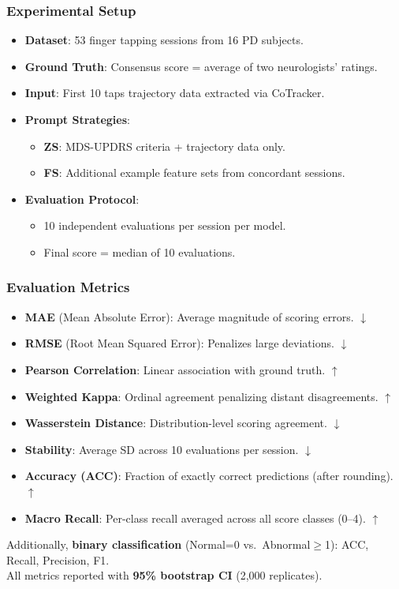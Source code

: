 \documentclass[aspectratio=169]{beamer}
\begin{document}
\begin{frame}
    \frametitle{Experimental Setup}
    \begin{itemize}
        \item \textbf{Dataset}: 53 finger tapping sessions from 16 PD subjects.
        \item \textbf{Ground Truth}: Consensus score = average of two neurologists' ratings.
        \item \textbf{Input}: First 10 taps trajectory data extracted via CoTracker.
        \item \textbf{Prompt Strategies}:
        \begin{itemize}
            \item \textbf{ZS}: MDS-UPDRS criteria + trajectory data only.
            \item \textbf{FS}: Additional example feature sets from concordant sessions.
        \end{itemize}
        \item \textbf{Evaluation Protocol}:
        \begin{itemize}
            \item 10 independent evaluations per session per model.
            \item Final score = median of 10 evaluations.
        \end{itemize}
    \end{itemize}
\end{frame}


\begin{frame}
    \frametitle{Evaluation Metrics}
    \begin{itemize}
        \item \textbf{MAE} (Mean Absolute Error): Average magnitude of scoring errors. $\downarrow$
        \item \textbf{RMSE} (Root Mean Squared Error): Penalizes large deviations. $\downarrow$
        \item \textbf{Pearson Correlation}: Linear association with ground truth. $\uparrow$
        \item \textbf{Weighted Kappa}: Ordinal agreement penalizing distant disagreements. $\uparrow$
        \item \textbf{Wasserstein Distance}: Distribution-level scoring agreement. $\downarrow$
        \item \textbf{Stability}: Average SD across 10 evaluations per session. $\downarrow$
        \item \textbf{Accuracy (ACC)}: Fraction of exactly correct predictions (after rounding). $\uparrow$
        \item \textbf{Macro Recall}: Per-class recall averaged across all score classes (0--4). $\uparrow$
    \end{itemize}
    \vspace{0.3em}
    Additionally, \textbf{binary classification} (Normal=0 vs.\ Abnormal$\geq$1): ACC, Recall, Precision, F1.\\
    All metrics reported with \textbf{95\% bootstrap CI} (2,000 replicates).
\end{frame}
\end{document}
